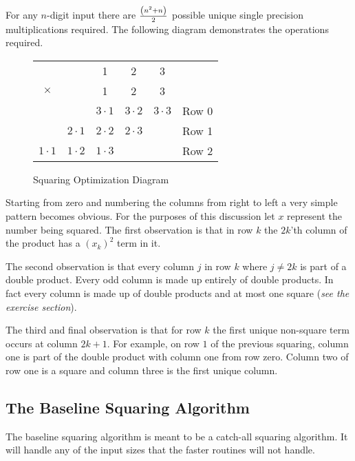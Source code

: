 \documentclass[b5paper]{book}
\begin{document}
For any $n$-digit input there are ${{\left (n^2 + n \right)}\over 2}$ possible unique single precision multiplications required.  The following
diagram demonstrates the operations required.

\begin{figure}[here]
\begin{center}
\begin{tabular}{ccccc|c}
&&1&2&3&\\
$\times$ &&1&2&3&\\
\hline && $3 \cdot 1$ & $3 \cdot 2$ & $3 \cdot 3$ & Row 0\\
       & $2 \cdot 1$  & $2 \cdot 2$ & $2 \cdot 3$ && Row 1 \\
         $1 \cdot 1$  & $1 \cdot 2$ & $1 \cdot 3$ &&& Row 2 \\
\end{tabular}
\end{center}
\caption{Squaring Optimization Diagram}
\end{figure}

Starting from zero and numbering the columns from right to left a very simple pattern becomes obvious.  For the purposes of this discussion let $x$
represent the number being squared.  The first observation is that in row $k$ the $2k$'th column of the product has a $\left (x_k \right)^2$ term in it.  

The second observation is that every column $j$ in row $k$ where $j \ne 2k$ is part of a double product.  Every odd column is made up entirely of 
double products.  In fact every column is made up of double products and at most one square (\textit{see the exercise section}).  

The third and final observation is that for row $k$ the first unique non-square term occurs at column $2k + 1$.  For example, on row $1$ of the 
previous squaring, column one is part of the double product with column one from row zero. Column two of row one is a square and column three is
the first unique column.

\subsection{The Baseline Squaring Algorithm}
The baseline squaring algorithm is meant to be a catch-all squaring algorithm.  It will handle any of the input sizes that the faster routines
will not handle.  
\end{document}
